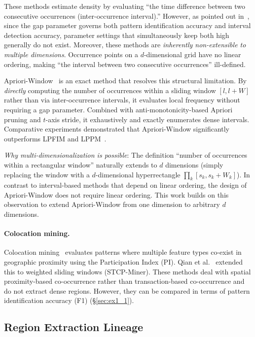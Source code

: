 These methods estimate density by evaluating
``the time difference between two consecutive occurrences
(inter-occurrence interval).''
However, as pointed out in~\cite{aprioriwindow},
since the gap parameter governs both pattern identification accuracy
and interval detection accuracy,
parameter settings that simultaneously keep both high
generally do not exist.
Moreover, these methods are \emph{inherently non-extensible to
multiple dimensions}.
Occurrence points on a $d$-dimensional grid
have no linear ordering,
making ``the interval between two consecutive occurrences''
ill-defined.

Apriori-Window~\cite{aprioriwindow} is an exact method
that resolves this structural limitation.
By \emph{directly} computing the number of occurrences
within a sliding window $[l, l+W]$
rather than via inter-occurrence intervals,
it evaluates local frequency without requiring a gap parameter.
Combined with anti-monotonicity-based Apriori pruning
and $t$-axis stride, it exhaustively and exactly
enumerates dense intervals.
Comparative experiments demonstrated that
Apriori-Window significantly outperforms
LPFIM and LPPM~\cite{aprioriwindow}.

\emph{Why multi-dimensionalization is possible}:
The definition ``number of occurrences within a rectangular window''
naturally extends to $d$ dimensions
(simply replacing the window with a $d$-dimensional hyperrectangle
$\prod_k [s_k, s_k+W_k]$).
In contrast to interval-based methods
that depend on linear ordering,
the design of Apriori-Window does not require linear ordering.
This work builds on this observation to extend
Apriori-Window from one dimension to arbitrary $d$ dimensions.

\paragraph{Colocation mining.}
Colocation mining~\cite{shekhar2001colocation}
evaluates patterns where multiple feature types
co-exist in geographic proximity
using the Participation Index (PI).
Qian et al.~\cite{qian2009stcolocation} extended this
to weighted sliding windows (STCP-Miner).
These methods deal with spatial proximity-based co-occurrence
rather than transaction-based co-occurrence
and do not extract dense regions.
However, they can be compared in terms of
pattern identification accuracy (F1) (\S\ref{sec:ex1_1}).

\subsection{Region Extraction Lineage}

